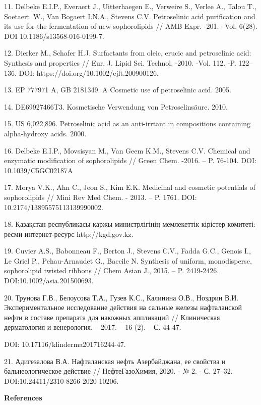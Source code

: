 \begin{noparindent}
11. Delbeke E.I.P., Everaert J., Uitterhaegen E., Verweire S., Verlee
A., Talou T., Soetaert~W., Van Bogaert I.N.A., Stevens C.V. Petroselinic
acid purification and its use for the fermentation of new sophorolipids
// AMB Expr. -201. --Vol. 6(28). DOI 10.1186/s13568-016-0199-7.

12. Dierker M., Schafer H.J. Surfactants from oleic, erucic and
petroselinic acid: Synthesis and properties // Eur. J. Lipid Sci.
Technol. -2010. -Vol. 112. -P. 122--136. DOI:
https://doi.org/10.1002/ejlt.200900126.

13. EP 777971 A, GB 2181349. A Cosmetic use of petroselinic acid. 2005.

14. DE69927466T3. Kosmetische Verwendung von Petroselinsäure. 2010.

15. US 6,022,896. Petroselinic acid as an anti-irrtant in compositions
containing alpha-hydroxy acids. 2000.

16. Delbeke E.I.P., Movsisyan M., Van Geem K.M., Stevens C.V. Chemical
and enzymatic modification of sophorolipids // Green Chem. -2016. -- P.
76-104. DOI: 10.1039/C5GC02187A

17. Morya V.K., Ahn C., Jeon S., Kim E.K. Medicinal and cosmetic
potentials of sophorolipids // Mini Rev Med Chem. - 2013. -- P. 1761.
DOI: 10.2174/13895575113139990002.

18. Қазақстан республикасы қаржы министрлігінің мемлекеттік кірістер
комитеті: ресми интернет-ресурс http://kgd.gov.kz.

19. Cuvier A.S., Babonneau F., Berton J., Stevens C.V., Fadda G.C.,
Genois I., Le Griel P., Pehau-Arnaudet G., Baccile N. Synthesis of
uniform, monodisperse, sophorolipid twisted ribbons // Chem Asian J.,
2015. -- P. 2419-2426. DOI:10.1002/asia.201500693.

20. Трунова Г.В., Белоусова Т.А., Гузев К.С., Калинина О.В., Ноздрин
В.И. Экспериментальное исследование действия на сальные железы
нафталанской нефти в составе препарата для накожных аппликаций //
Клиническая дерматология и венерология. -- 2017. -- 16 (2). -- С. 44‑47.

DOI: 10.17116/klinderma201716244-47.

21. Адигезалова В.А. Нафталанская нефть Азербайджана, ее свойства и
бальнеологическое действие // НефтеГазоХимия, 2020. - № 2. - С. 27--32.
DOI:10.24411/2310-8266-2020-10206.
\end{noparindent}

\begin{center}
{\bfseries References}
\end{center}


